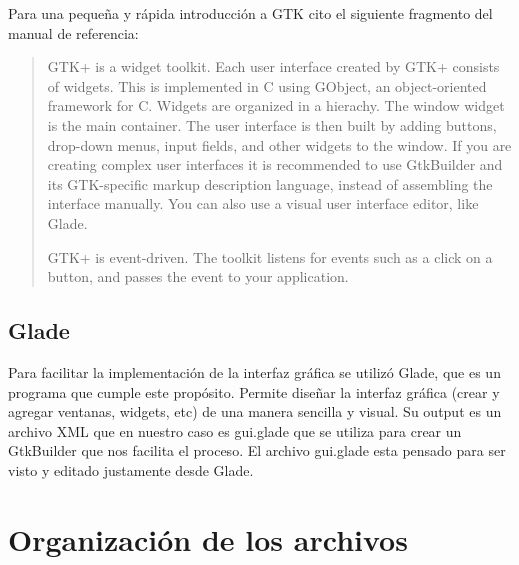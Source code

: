 \documentclass[a4paper,10pt]{article}
\begin{document}
Para una pequeña y rápida introducción a GTK cito el siguiente fragmento del manual de referencia:
\begin{quotation}
GTK+ is a widget toolkit. Each user interface created by GTK+ consists of widgets. This is implemented in C using GObject, an object-oriented framework for C. Widgets are organized in a hierachy. The window widget is the main container. The user interface is then built by adding buttons, drop-down menus, input fields, and other widgets to the window. If you are creating complex user interfaces it is recommended to use GtkBuilder and its GTK-specific markup description language, instead of assembling the interface manually. You can also use a visual user interface editor, like Glade.

GTK+ is event-driven. The toolkit listens for events such as a click on a button, and passes the event to your application. 
\end{quotation}

\subsection{Glade}
Para facilitar la implementación de la interfaz gráfica se utilizó Glade, que es un programa que cumple este propósito. Permite diseñar la interfaz gráfica (crear y agregar ventanas, widgets, etc) de una manera sencilla y visual. Su output es un archivo XML que en nuestro caso es gui.glade que se utiliza para crear un GtkBuilder que nos facilita el proceso. El archivo gui.glade esta pensado para ser visto y editado justamente desde Glade.

\section{Organización de los archivos}
\end{document}
